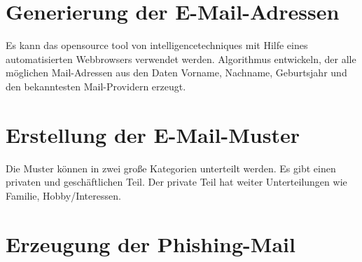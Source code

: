 \section{Generierung der E-Mail-Adressen}
Es kann das opensource tool von intelligencetechniques mit Hilfe eines automatisierten Webbrowsers verwendet werden. Algorithmus entwickeln, der alle möglichen Mail-Adressen aus den Daten Vorname, Nachname, Geburtsjahr und den bekanntesten Mail-Providern erzeugt.

\section{Erstellung der E-Mail-Muster}
Die Muster können in zwei große Kategorien unterteilt werden. Es gibt einen privaten und geschäftlichen Teil. Der private Teil hat weiter Unterteilungen wie Familie, Hobby/Interessen.
\section{Erzeugung der Phishing-Mail}
